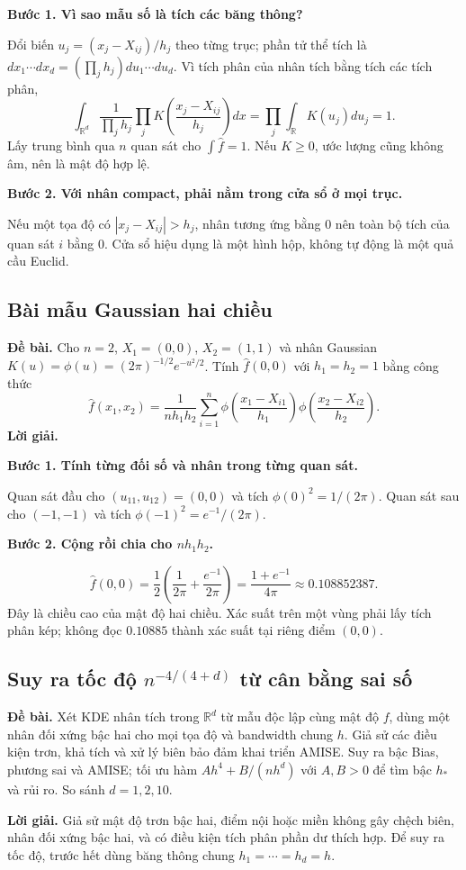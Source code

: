 \documentclass[11pt,a4paper]{article}
\newcommand{\R}{\mathbb R}
\newcommand{\buoc}[1]{\par\medskip\textbf{#1}\par}
\begin{document}
\buoc{Bước 1. Vì sao mẫu số là tích các băng thông?}
Đổi biến $u_j=(x_j-X_{ij})/h_j$ theo từng trục; phần tử thể tích là $dx_1\cdots dx_d=(\prod_jh_j)du_1\cdots du_d$. Vì tích phân của nhân tích bằng tích các tích phân,
\[
\int_{\R^d}\frac1{\prod_jh_j}\prod_jK\!\left(\frac{x_j-X_{ij}}{h_j}\right)dx
=\prod_j\int_{\R}K(u_j)du_j=1.
\]
Lấy trung bình qua $n$ quan sát cho $\int\widehat f=1$. Nếu $K\geq0$, ước lượng cũng không âm, nên là mật độ hợp lệ.

\buoc{Bước 2. Với nhân compact, phải nằm trong cửa sổ ở mọi trục.}
Nếu một tọa độ có $|x_j-X_{ij}|>h_j$, nhân tương ứng bằng 0 nên toàn bộ tích của quan sát $i$ bằng 0. Cửa sổ hiệu dụng là một hình hộp, không tự động là một quả cầu Euclid.

\subsection{Bài mẫu Gaussian hai chiều}
\textbf{Đề bài.} Cho $n=2$, $X_1=(0,0)$, $X_2=(1,1)$ và nhân Gaussian
$K(u)=\phi(u)=(2\pi)^{-1/2}e^{-u^2/2}$.
Tính $\widehat f(0,0)$ với $h_1=h_2=1$ bằng công thức
\[
\widehat f(x_1,x_2)=\frac1{nh_1h_2}\sum_{i=1}^n
\phi\left(\frac{x_1-X_{i1}}{h_1}\right)
\phi\left(\frac{x_2-X_{i2}}{h_2}\right).
\]
\textbf{Lời giải.}
\buoc{Bước 1. Tính từng đối số và nhân trong từng quan sát.}
Quan sát đầu cho $(u_{11},u_{12})=(0,0)$ và tích $\phi(0)^2=1/(2\pi)$. Quan sát sau cho $(-1,-1)$ và tích $\phi(-1)^2=e^{-1}/(2\pi)$.
\buoc{Bước 2. Cộng rồi chia cho $nh_1h_2$.}
\[
\boxed{\widehat f(0,0)=\frac12\left(\frac1{2\pi}+\frac{e^{-1}}{2\pi}\right)
=\frac{1+e^{-1}}{4\pi}\approx0.108852387.}
\]
Đây là chiều cao của mật độ hai chiều. Xác suất trên một vùng phải lấy tích phân kép; không đọc $0.10885$ thành xác suất tại riêng điểm $(0,0)$.

\subsection{Suy ra tốc độ \texorpdfstring{$n^{-4/(4+d)}$}{n mũ -4/(4+d)} từ cân bằng sai số}
\textbf{Đề bài.} Xét KDE nhân tích trong $\R^d$ từ mẫu độc lập cùng mật độ $f$,
dùng một nhân đối xứng bậc hai cho mọi tọa độ và bandwidth chung $h$.
Giả sử các điều kiện trơn, khả tích và xử lý biên bảo đảm khai triển AMISE.
Suy ra bậc Bias, phương sai và AMISE; tối ưu hàm $Ah^4+B/(nh^d)$ với $A,B>0$
để tìm bậc $h_*$ và rủi ro. So sánh $d=1,2,10$.

\textbf{Lời giải.}
Giả sử mật độ trơn bậc hai, điểm nội hoặc miền không gây chệch biên, nhân đối xứng bậc hai, và có điều kiện tích phân phần dư thích hợp. Để suy ra tốc độ, trước hết dùng băng thông chung $h_1=\cdots=h_d=h$.
\end{document}
